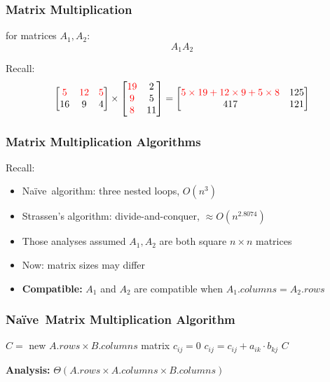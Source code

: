 \documentclass[10pt,aspectratio=169]{beamer}
\newcommand{\Naive}{Na\"{i}ve~}
\begin{document}
\begin{frame} \frametitle{Matrix Multiplication}
  for matrices $A_1, A_2:$
  \[ A_1 A_2 \]

  Recall:
  \[
  \begin{bmatrix}
    \textcolor{red}{5} & \textcolor{red}{12} & \textcolor{red}{5} \\
    16 & 9 & 4
  \end{bmatrix}
  \times
  \begin{bmatrix}
    \textcolor{red}{19} & 2 \\
    \textcolor{red}{9} & 5 \\
    \textcolor{red}{8} & 11
  \end{bmatrix}
  =
  \begin{bmatrix}
    \textcolor{red}{5 \times 19 + 12 \times 9 + 5 \times 8} & 125 \\
    417 & 121 
  \end{bmatrix}
  \]
\end{frame}

\begin{frame} \frametitle{Matrix Multiplication Algorithms}
Recall:
  \begin{itemize}
    \item \Naive algorithm: three nested loops, $O(n^3)$
    \item Strassen's algorithm: divide-and-conquer, $\approx O(n^{2.8074})$
    \item Those analyses assumed $A_1, A_2$ are both square $n \times n$ matrices
    \item Now: matrix sizes may differ
    \item \textbf{Compatible:} $A_1$ and $A_2$ are compatible when $A_1.columns = A_2.rows$
  \end{itemize}
\end{frame}

\begin{frame} \frametitle{\Naive Matrix Multiplication Algorithm}

  {\small
  \begin{algorithmic}[1]
    \State $C = $ new $A.rows \times B.columns$ matrix
        \State $c_{ij} = 0$
          \State $c_{ij} = c_{ij} + a_{ik} \cdot b_{kj}$
        \EndFor
      \EndFor
    \EndFor
    \State \Return $C$
    \EndFunction
  \end{algorithmic}
  }
  \vspace{14pt}
  
  \textbf{Analysis:} $\Theta(A.rows \times A.columns \times B.columns)$

\end{frame}
\end{document}
